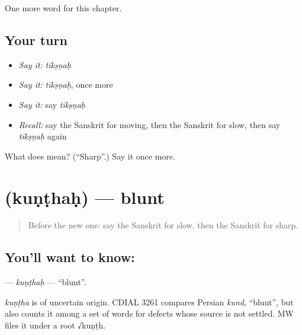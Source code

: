 \begin{grammarlens}[title={What you've built}]
One more word for this chapter.
\end{grammarlens}

\subsection*{Your turn}
\begin{itemize}
\raggedright
  \item \emph{Say it:} \emph{tīkṣṇaḥ}
  \item \emph{Say it:} \emph{tīkṣṇaḥ}, once more
  \item \emph{Say it:} say \emph{tīkṣṇaḥ}
  \item \emph{Recall:} say the Sanskrit for moving, then the Sanskrit for slow, then say \emph{tīkṣṇaḥ} again
\end{itemize}

\begin{tcolorbox}[breakable,colback=teal!4,colframe=teal!35!black,title={Before you move on}]
What does  mean? (\textquotedblleft{}Sharp\textquotedblright{}.) Say it once more.
\end{tcolorbox}
\section[\texorpdfstring{\sk{कुण्ठः} (kuṇṭhaḥ)}{कुण्ठः (kuṇṭhaḥ)}]{ (kuṇṭhaḥ) — blunt}

\label{lesson:SA-C215-kunthah}



\begin{quote}
Before the new one: say the Sanskrit for slow, then the Sanskrit for sharp.
\end{quote}

\subsection*{You'll want to know: }
\textbf{} — \emph{kuṇṭhaḥ} — \textquotedblleft{}blunt\textquotedblright{}.

\begin{cousinweb}
\emph{kuṇṭha} is of uncertain origin. CDIAL 3261 compares Persian \emph{kund}, \textquotedblleft{}blunt\textquotedblright{}, but also counts it among a set of words for defects whose source is not settled. MW files it under a root √kuṇṭh.
\end{cousinweb}

